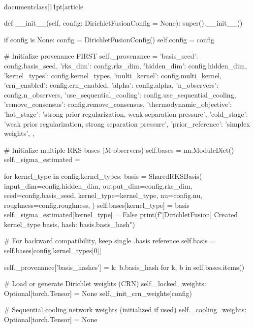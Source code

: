 \\documentclass[11pt]{article}
\begin{document}
\begin{CodeBlock}
    def __init__(self, config: DirichletFusionConfig = None):
        super().__init__()
        
        if config is None:
            config = DirichletFusionConfig()
        self.config = config
        
        # Initialize provenance FIRST
        self._provenance = {
            'basis_seed': config.basis_seed,
            'rks_dim': config.rks_dim,
            'hidden_dim': config.hidden_dim,
            'kernel_types': config.kernel_types,
            'multi_kernel': config.multi_kernel,
            'crn_enabled': config.crn_enabled,
            'alpha': config.alpha,
            'n_observers': config.n_observers,
            'use_sequential_cooling': config.use_sequential_cooling,
            'remove_consensus': config.remove_consensus,
            'thermodynamic_objective': {
                'hot_stage': 'strong prior regularization, weak separation pressure',
                'cold_stage': 'weak prior regularization, strong separation pressure',
                'prior_reference': 'simplex weights',
            },
        }
        
        # Initialize multiple RKS bases (M-observers)
        self.bases = nn.ModuleDict()
        self._sigma_estimated = {}
        
        for kernel_type in config.kernel_types:
            basis = SharedRKSBasis(
                input_dim=config.hidden_dim,
                output_dim=config.rks_dim,
                seed=config.basis_seed,
                kernel_type=kernel_type,
                nu=config.nu,
                roughness=config.roughness,
            )
            self.bases[kernel_type] = basis
            self._sigma_estimated[kernel_type] = False
            print(f"[DirichletFusion] Created {kernel_type} basis, hash: {basis.basis_hash}")
        
        # For backward compatibility, keep single .basis reference
        self.basis = self.bases[config.kernel_types[0]]
        
        self._provenance['basis_hashes'] = {k: b.basis_hash for k, b in self.bases.items()}
        
        # Load or generate Dirichlet weights (CRN)
        self._locked_weights: Optional[torch.Tensor] = None
        self._init_crn_weights(config)
        
        # Sequential cooling network weights (initialized if used)
        self._cooling_weights: Optional[torch.Tensor] = None
    

\end{CodeBlock}
\end{document}
